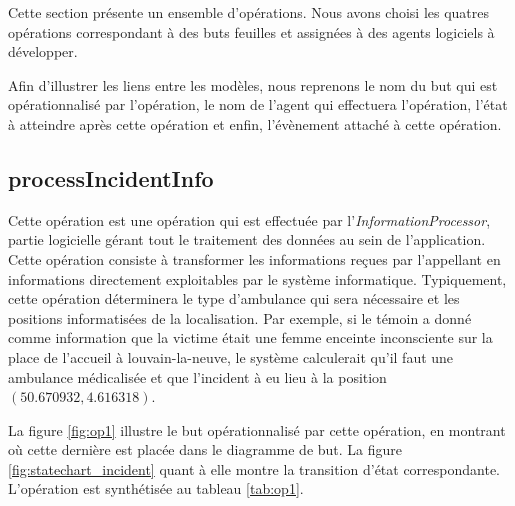 Cette section présente un ensemble d'opérations. Nous avons choisi les quatres
opérations correspondant à des buts feuilles et assignées à des agents logiciels
à développer.

Afin d'illustrer les liens entre les modèles, nous reprenons le nom du but
qui est opérationnalisé par l'opération, le nom de l'agent qui effectuera 
l'opération, l'état à atteindre après cette opération et enfin, l'évènement
attaché à cette opération.

\subsection{processIncidentInfo}

	Cette opération est une opération qui est effectuée par l'\textit{InformationProcessor},
	partie logicielle gérant tout le traitement des données au sein de
	l'application. Cette opération consiste à transformer les informations
	reçues par l'appellant en informations directement exploitables par le
	système informatique. Typiquement, cette opération déterminera 
	le type d'ambulance qui sera nécessaire et les positions \og informatisées \fg
	de la localisation. Par exemple, si le témoin a donné comme information
	que la victime était une femme enceinte inconsciente sur la place de l'accueil
	à louvain-la-neuve, le système calculerait qu'il faut une ambulance
	médicalisée et que l'incident à eu lieu à la position $(50.670932,4.616318)$.
	
	La figure \ref{fig:op1} illustre le but opérationnalisé par cette opération,
	en montrant où cette dernière est placée dans le diagramme de but. La figure
	\ref{fig:statechart_incident} quant à elle montre la transition d'état 
	correspondante. L'opération est synthétisée au tableau \ref{tab:op1}.
	
	
